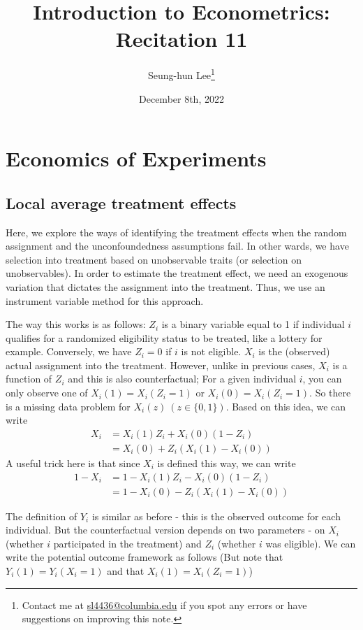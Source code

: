 \documentclass[12pt]{article}
\title{Introduction to Econometrics: Recitation 11}
\theoremstyle{definition}
\theoremstyle{property}
\theoremstyle{assumption}
\theoremstyle{example}
\theoremstyle{comment}
\begin{document}
\linespread{1.25}
\onehalfspacing

\author{Seung-hun Lee\footnote{Contact me at \href{mailto:sl4436@columbia.edu}{sl4436@columbia.edu} if you spot any errors or have suggestions on improving this note.}}
\date{December 8th, 2022}
\maketitle
\thispagestyle{firstpage}


\section{Economics of Experiments}
\subsection{Local average treatment effects}
Here, we explore the ways of identifying the treatment effects when the random assignment and the unconfoundedness assumptions fail. In other wards, we have selection into treatment based on unobservable traits (or selection on unobservables). In order to estimate the treatment effect, we need an exogenous variation that dictates the assignment into the treatment. Thus, we use an instrument variable method for this approach. 
\par
The way this works is as follows: $Z_i$ is a binary variable equal to 1 if individual $i$ qualifies for a randomized eligibility status to be treated, like a lottery for example. Conversely, we have $Z_i=0$ if $i$ is not eligible. $X_i$ is the (observed) actual assignment into the treatment. However, unlike in previous cases, $X_i$ is a function of $Z_i$ and this is also counterfactual; For a given individual $i$, you can only observe one of $X_i(1)=X_i(Z_i=1)$ or  $X_i(0)=X_i(Z_i=1)$. So there is a missing data problem for $X_i(z) \ (z\in\{0,1\})$. Based on this idea, we can write 
\[
\begin{aligned}
X_i &= X_i(1)Z_i+ X_i(0)(1-Z_i)\\
&=X_i(0)+Z_i(X_i(1)-X_i(0))
\end{aligned}
\]
A useful trick here is that since $X_i$ is defined this way, we can write
\[
\begin{aligned}
1- X_i &= 1- X_i(1)Z_i- X_i(0)(1-Z_i)\\
&=1-X_i(0)-Z_i(X_i(1)-X_i(0))
\end{aligned}
\]
\par
The definition of $Y_i$ is similar as before - this is the observed outcome for each individual. But the counterfactual version depends on two parameters - on $X_i$ (whether $i$ participated in the treatment) and $Z_i$ (whether $i$ was eligible). We can write the potential outcome framework as follows (But note that $Y_i(1)=Y_i(X_i=1)$ and that $X_i(1) = X_i(Z_i=1)$)
\end{document}

